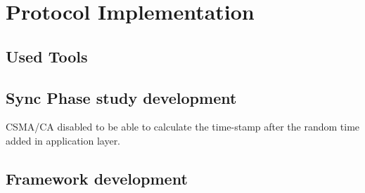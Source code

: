 \chapter{Protocol Implementation}
\label{chap:protocolimplementation}

\section{Used Tools}


\section{Sync Phase study development}

\ac{CSMA/CA} disabled to be able to calculate the time-stamp after the random time added in application layer. 

\section{Framework development}
